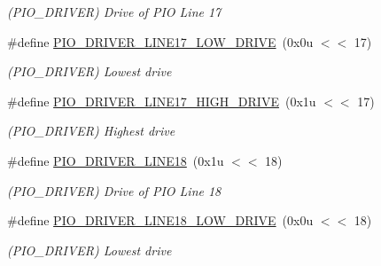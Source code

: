 \begin{DoxyCompactItemize}
\begin{DoxyCompactList}\small\item\em (P\+I\+O\+\_\+\+D\+R\+I\+V\+ER) Drive of P\+IO Line 17 \end{DoxyCompactList}\item 
\mbox{\label{group__SAMS70__PIO_ga3d9d2cd987f82161d91df30e5acabb4e}} 
\#define \mbox{\hyperlink{group__SAMS70__PIO_ga3d9d2cd987f82161d91df30e5acabb4e}{P\+I\+O\+\_\+\+D\+R\+I\+V\+E\+R\+\_\+\+L\+I\+N\+E17\+\_\+\+L\+O\+W\+\_\+\+D\+R\+I\+VE}}~(0x0u $<$$<$ 17)
\begin{DoxyCompactList}\small\item\em (P\+I\+O\+\_\+\+D\+R\+I\+V\+ER) Lowest drive \end{DoxyCompactList}\item 
\mbox{\label{group__SAMS70__PIO_ga8ca5047f160df0ee94f507cc3b1d8cf3}} 
\#define \mbox{\hyperlink{group__SAMS70__PIO_ga8ca5047f160df0ee94f507cc3b1d8cf3}{P\+I\+O\+\_\+\+D\+R\+I\+V\+E\+R\+\_\+\+L\+I\+N\+E17\+\_\+\+H\+I\+G\+H\+\_\+\+D\+R\+I\+VE}}~(0x1u $<$$<$ 17)
\begin{DoxyCompactList}\small\item\em (P\+I\+O\+\_\+\+D\+R\+I\+V\+ER) Highest drive \end{DoxyCompactList}\item 
\mbox{\label{group__SAMS70__PIO_ga9a6f6b92dce05a3af8f16c6ab13046f7}} 
\#define \mbox{\hyperlink{group__SAMS70__PIO_ga9a6f6b92dce05a3af8f16c6ab13046f7}{P\+I\+O\+\_\+\+D\+R\+I\+V\+E\+R\+\_\+\+L\+I\+N\+E18}}~(0x1u $<$$<$ 18)
\begin{DoxyCompactList}\small\item\em (P\+I\+O\+\_\+\+D\+R\+I\+V\+ER) Drive of P\+IO Line 18 \end{DoxyCompactList}\item 
\mbox{\label{group__SAMS70__PIO_ga4a9b6ca6aaab7fc6812f83cb21393285}} 
\#define \mbox{\hyperlink{group__SAMS70__PIO_ga4a9b6ca6aaab7fc6812f83cb21393285}{P\+I\+O\+\_\+\+D\+R\+I\+V\+E\+R\+\_\+\+L\+I\+N\+E18\+\_\+\+L\+O\+W\+\_\+\+D\+R\+I\+VE}}~(0x0u $<$$<$ 18)
\begin{DoxyCompactList}\small\item\em (P\+I\+O\+\_\+\+D\+R\+I\+V\+ER) Lowest drive \end{DoxyCompactList}\item 

\end{DoxyCompactItemize}
